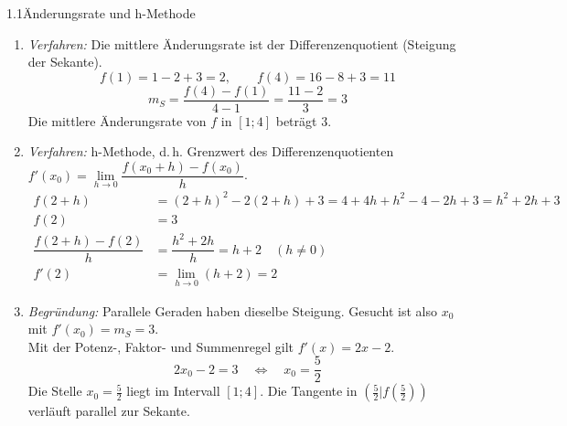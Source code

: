 

\begin{loesung}{1.1}{Änderungsrate und h-Methode}
\begin{enumerate}[label=\alph*)]
  \item \textit{Verfahren:} Die mittlere Änderungsrate ist der Differenzenquotient (Steigung der Sekante).
  \[f(1) = 1-2+3 = 2,\qquad f(4) = 16-8+3 = 11\]
  \[m_S = \dfrac{f(4)-f(1)}{4-1} = \dfrac{11-2}{3} = 3\]
  Die mittlere Änderungsrate von $f$ in $[1;4]$ beträgt $3$.
  \item \textit{Verfahren:} h-Methode, d.\,h. Grenzwert des Differenzenquotienten $f'(x_0)=\lim\limits_{h\longrightarrow 0}\dfrac{f(x_0+h)-f(x_0)}{h}$.
  \begin{align*}
    f(2+h) &= (2+h)^2-2(2+h)+3 = 4+4h+h^2-4-2h+3 = h^2+2h+3\\
    f(2) &= 3\\
    \dfrac{f(2+h)-f(2)}{h} &= \dfrac{h^2+2h}{h} = h+2 \quad (h\neq 0)\\
    f'(2) &= \lim\limits_{h\longrightarrow 0}(h+2) = 2
  \end{align*}
  \item \textit{Begründung:} Parallele Geraden haben dieselbe Steigung. Gesucht ist also $x_0$ mit $f'(x_0)=m_S=3$.\\
  Mit der Potenz-, Faktor- und Summenregel gilt $f'(x) = 2x-2$.
  \[2x_0-2 = 3 \quad\Longleftrightarrow\quad x_0 = \dfrac{5}{2}\]
  Die Stelle $x_0=\frac{5}{2}$ liegt im Intervall $[1;4]$. Die Tangente in $\left(\frac{5}{2}\big|f(\frac{5}{2})\right)$ verläuft parallel zur Sekante.
\end{enumerate}
\end{loesung}

